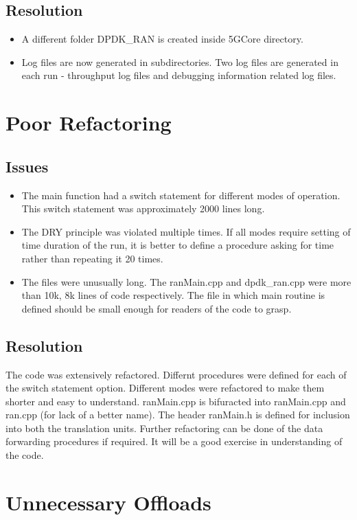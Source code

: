 \subsection{Resolution}
\begin{itemize}
	\item A different folder DPDK\_RAN is created inside 5GCore directory.
	\item Log files are now generated in subdirectories. Two log files are generated in each run - throughput 
	log files and debugging information related log files.
\end{itemize}
\section{Poor Refactoring}

\subsection{Issues}
\begin{itemize}
	\item The main function had a switch statement for different modes of operation. This switch statement was approximately 2000 lines long.
	\item The DRY principle was violated multiple times. If all modes require setting of time duration of the run, it is better to
	define a procedure asking for time rather than repeating it 20 times.
	\item The files were unusually long. The ranMain.cpp and dpdk\_ran.cpp were more than 10k,  8k lines of code respectively.
	The file in which main routine is defined should be small enough for readers of the code to grasp.
\end{itemize}	
\subsection{Resolution}
The code was extensively refactored. Differnt procedures were defined for each of the switch statement option.
Different modes were refactored to make them shorter and easy to understand. 
ranMain.cpp is bifuracted into ranMain.cpp and ran.cpp (for lack of a better name). The header ranMain.h is defined for
inclusion into both the translation units.
Further refactoring can be done of the data forwarding procedures if required. It will be a good exercise in 
understanding of the code.

\section{Unnecessary Offloads}
